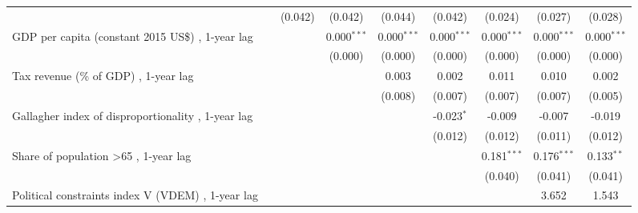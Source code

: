 \begin{table}[htbp]
\begin{tabular}{lcccccccc}
                                                                                                 &         & (0.042)       & (0.042)       & (0.044)       & (0.042)       & (0.024)        & (0.027)        & (0.028)\\   
      GDP per capita (constant 2015 US\$) , 1-year lag                                           &         &               & 0.000$^{***}$ & 0.000$^{***}$ & 0.000$^{***}$ & 0.000$^{***}$  & 0.000$^{***}$  & 0.000$^{***}$\\   
                                                                                                 &         &               & (0.000)       & (0.000)       & (0.000)       & (0.000)        & (0.000)        & (0.000)\\   
      Tax revenue (\% of GDP) , 1-year lag                                                       &         &               &               & 0.003         & 0.002         & 0.011          & 0.010          & 0.002\\   
                                                                                                 &         &               &               & (0.008)       & (0.007)       & (0.007)        & (0.007)        & (0.005)\\   
      Gallagher index of disproportionality , 1-year lag                                         &         &               &               &               & -0.023$^{*}$  & -0.009         & -0.007         & -0.019\\   
                                                                                                 &         &               &               &               & (0.012)       & (0.012)        & (0.011)        & (0.012)\\   
      Share of population >65 , 1-year lag                                                       &         &               &               &               &               & 0.181$^{***}$  & 0.176$^{***}$  & 0.133$^{**}$\\   
                                                                                                 &         &               &               &               &               & (0.040)        & (0.041)        & (0.041)\\   
      Political constraints index V (VDEM) , 1-year lag                                          &         &               &               &               &               &                & 3.652          & 1.543\\   

\end{tabular}
\end{table}
